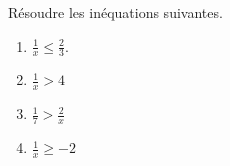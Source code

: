 
\begin{exercice}\label{exosmath-0278}

    Résoudre les inéquations suivantes.
    \begin{enumerate}
        \item
            \( \frac{1}{ x }\leq \frac{ 2 }{ 3 }\).
        \item
            \( \frac{1}{ x }> 4\)
        \item
            \( \frac{1}{ 7 }>\frac{2}{ x } \)
        \item
            \( \frac{ 1 }{ x }\geq -2\)
    \end{enumerate}
    

\end{exercice}
